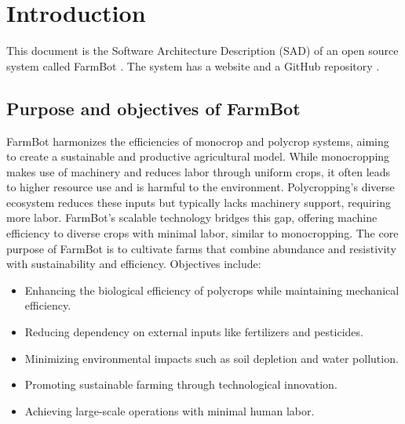 
\chapter{Introduction} \label{introduction}
This document is the Software Architecture Description (SAD) of an open source system called FarmBot \cite{FarmBotWhitepaper}. The system has a website \cite{FarmBotWebsite} and a GitHub repository \cite{FarmBotGitHub}.

\section{Purpose and objectives of FarmBot}
FarmBot harmonizes the efficiencies of monocrop and polycrop systems, aiming to create a sustainable and productive agricultural model. While monocropping makes use of machinery and reduces labor through uniform crops, it often leads to higher resource use and is harmful to the environment. Polycropping's diverse ecosystem reduces these inputs but typically lacks machinery support, requiring more labor. FarmBot's scalable technology bridges this gap, offering machine efficiency to diverse crops with minimal labor, similar to monocropping. The core purpose of FarmBot is to cultivate farms that combine abundance and resistivity with sustainability and efficiency. Objectives include:
\begin{itemize}
    \item Enhancing the biological efficiency of polycrops while maintaining mechanical efficiency.
    \item Reducing dependency on external inputs like fertilizers and pesticides.
    \item Minimizing environmental impacts such as soil depletion and water pollution.
    \item Promoting sustainable farming through technological innovation.
    \item Achieving large-scale operations with minimal human labor.
\end{itemize}

